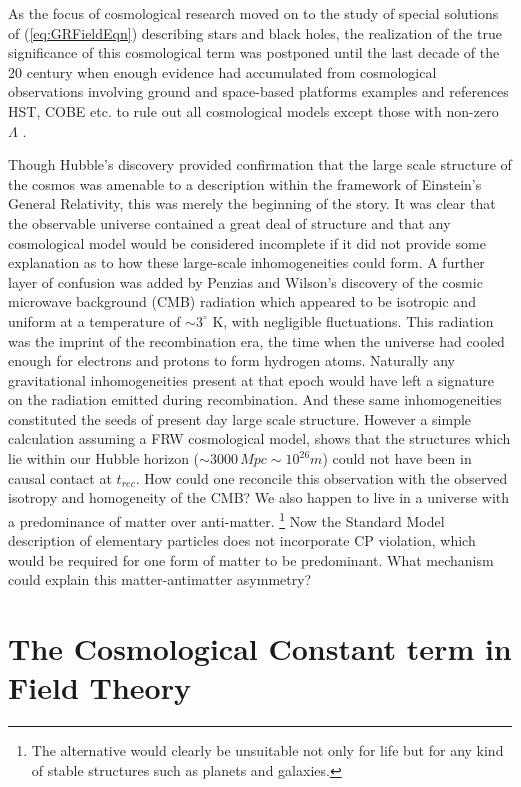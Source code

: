 \documentclass[11pt,english,rmp]{revtex4}
\begin{document}
As the focus of cosmological research moved on to the study of special
solutions of (\ref{eq:GRFieldEqn}) describing stars and black holes,
the realization of the true significance of this cosmological term
was postponed until the last decade of the 20 century when enough
evidence had accumulated from cosmological observations involving
ground and space-based platforms examples and references HST, COBE etc. to rule out all cosmological models except those with non-zero $\Lambda$ \cite{Spergel2006Wilkinson}.

Though Hubble's discovery provided confirmation that the large scale
structure of the cosmos was amenable to a description within the framework
of Einstein's General Relativity, this was merely the beginning of
the story. It was clear that the observable universe contained a great
deal of structure and that any cosmological model would be considered
incomplete if it did not provide some explanation as to how these
large-scale inhomogeneities could form. A further layer of confusion
was added by Penzias and Wilson's \cite{Penzias1965A-Measurement} discovery of the cosmic
microwave background (CMB) radiation which appeared to be isotropic
and uniform at a temperature of $\sim3^{\circ}$ K, with negligible
fluctuations. This radiation was the imprint of the recombination
era, the time when the universe had cooled enough for electrons and
protons to form hydrogen atoms. Naturally any gravitational inhomogeneities
present at that epoch would have left a signature on the radiation
emitted during recombination. And these same inhomogeneities constituted
the seeds of present day large scale structure. However a simple calculation
assuming a FRW cosmological model, shows that the structures which
lie within our Hubble horizon ($\sim3000\, Mpc\sim10^{26}m$) could
not have been in causal contact at $t_{rec}$. How could one reconcile
this observation with the observed isotropy and homogeneity of the
CMB? We also happen to live in a universe with a predominance of matter
over anti-matter.%
\footnote{The alternative would clearly be unsuitable not only for life but
for any kind of stable structures such as planets and galaxies.%
} Now the Standard Model description of elementary particles does not
incorporate CP violation, which would be required for one form of
matter to be predominant. What mechanism could explain this matter-antimatter
asymmetry?

\section{The Cosmological Constant term in Field Theory}
\end{document}
